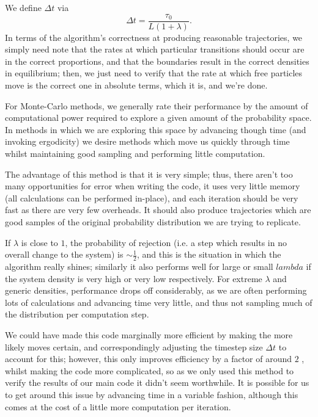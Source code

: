We define $\Delta t$ via 
\begin{equation}
 \Delta t = \frac{\tau_0}{L (1+\lambda)}.
\end{equation}
In terms of the algorithm's correctness at producing reasonable trajectories, we simply need note that
the rates at which particular transitions should occur are in the correct proportions, and that the boundaries result in the correct densities in equilibrium;
then, we just need
to verify that the rate at which free particles move is the correct one in absolute terms, which it is,
and we're done. 

For Monte-Carlo methods, we generally rate their performance by the amount of computational
power required to explore a given amount of the probability space. In methods in which we
are exploring this space by advancing though time (and invoking ergodicity) we desire methods
which move us quickly through time whilst maintaining good sampling and performing little computation.

The advantage of this method is that it is very simple; thus, there aren't too many opportunities
for error when writing the code, it uses very little memory (all calculations can be performed
in-place), and each iteration should be very fast as there are very few overheads. It should also
produce trajectories which are good samples of the original probability distribution we are 
trying to replicate.


If $\lambda$
is close to $1$, the probability of rejection (i.e. a step which results in no overall change to
the system) is $\sim\frac{1}{2}$, and this is the situation in which the algorithm really shines; similarly
it also performs well for large or small $lambda$ if the system density is very high or very low
respectively. For extreme $\lambda$ and generic densities,
performance drops off considerably,
as
we are often performing lots of calculations and advancing time very little, and thus not sampling
much of the distribution per computation step.

We could have made this code marginally more efficient by making the more likely moves certain, and
correspondingly adjusting the timestep size $\Delta t$ to account for this; however, this only
improves efficiency by a factor of around $2$ , whilst making the code more complicated, so as
we only used this method to verify the results of our main code it didn't seem worthwhile.
It is possible for us to get
around this issue by advancing time in a variable fashion, although this comes at the cost of
a little more computation per iteration.

